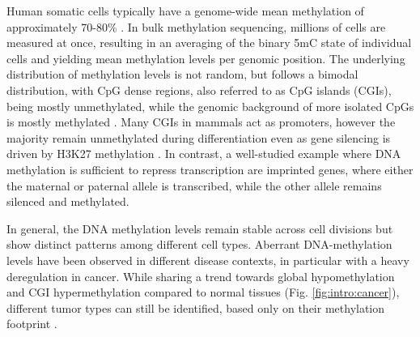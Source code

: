 %
%


Human somatic cells typically have a genome-wide mean methylation of approximately 70-80\% \cite{Bird2002}.
In bulk methylation sequencing, millions of cells are measured at once, resulting in an averaging of the binary 5mC state of individual cells and yielding mean methylation levels per genomic position.
The underlying distribution of methylation levels is not random, but follows a bimodal distribution, with CpG dense regions, also referred to as CpG islands (CGIs), being mostly unmethylated, while the genomic background of more isolated CpGs is mostly methylated \cite{Bird2002}.
Many CGIs in mammals act as promoters, however the majority remain unmethylated during differentiation even as gene silencing is driven by H3K27 methylation \cite{Larsen1992, Greenberg2019}.
In contrast, a well-studied example where DNA methylation is sufficient to repress transcription are imprinted genes, where either the maternal or paternal allele is transcribed, while the other allele remains silenced and methylated.

In general, the DNA methylation levels remain stable across cell divisions but show distinct patterns among different cell types. 
Aberrant DNA-methylation levels have been observed in different disease contexts, in particular with a heavy deregulation in cancer. 
While sharing a trend towards global hypomethylation and CGI hypermethylation compared to normal tissues (Fig. \ref{fig:intro:cancer}), different tumor types can still be identified, based only on their methylation footprint \cite{Capper2018}.

